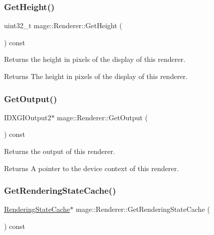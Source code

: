 \subsubsection{\texorpdfstring{Get\+Height()}{GetHeight()}}
{\footnotesize\ttfamily uint32\+\_\+t mage\+::\+Renderer\+::\+Get\+Height (\begin{DoxyParamCaption}{ }\end{DoxyParamCaption}) const\hspace{0.3cm}{\ttfamily [noexcept]}}

Returns the height in pixels of the display of this renderer.

\begin{DoxyReturn}{Returns}
The height in pixels of the display of this renderer. 
\end{DoxyReturn}
\hypertarget{classmage_1_1_renderer_a6f19510d91cb5dd71c41fde26db9aeaa}{}\label{classmage_1_1_renderer_a6f19510d91cb5dd71c41fde26db9aeaa} 
\subsubsection{\texorpdfstring{Get\+Output()}{GetOutput()}}
{\footnotesize\ttfamily I\+D\+X\+G\+I\+Output2$\ast$ mage\+::\+Renderer\+::\+Get\+Output (\begin{DoxyParamCaption}{ }\end{DoxyParamCaption}) const\hspace{0.3cm}{\ttfamily [noexcept]}}

Returns the output of this renderer.

\begin{DoxyReturn}{Returns}
A pointer to the device context of this renderer. 
\end{DoxyReturn}
\hypertarget{classmage_1_1_renderer_a5e48da6152df0ddfa52c079f77ee6873}{}\label{classmage_1_1_renderer_a5e48da6152df0ddfa52c079f77ee6873} 
\subsubsection{\texorpdfstring{Get\+Rendering\+State\+Cache()}{GetRenderingStateCache()}}
{\footnotesize\ttfamily \hyperlink{structmage_1_1_rendering_state_cache}{Rendering\+State\+Cache}$\ast$ mage\+::\+Renderer\+::\+Get\+Rendering\+State\+Cache (\begin{DoxyParamCaption}{ }\end{DoxyParamCaption}) const\hspace{0.3cm}{\ttfamily [noexcept]}}

